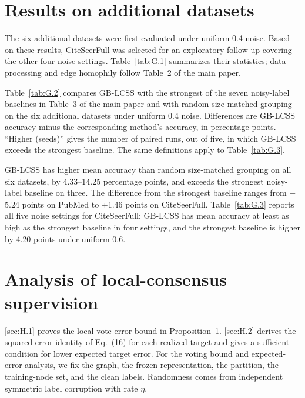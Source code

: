 \documentclass[10pt,letterpaper,nopreprintline]{elsarticle}
\begin{document}
\setcounter{table}{0}

\section{Results on additional datasets}\label{sec:G}

The six additional datasets were first evaluated under uniform 0.4 noise. Based on these results, CiteSeerFull was selected for an exploratory follow-up covering the other four noise settings. Table~\ref{tab:G.1} summarizes their statistics; data processing and edge homophily follow Table~2 of the main paper.



Table~\ref{tab:G.2} compares GB-LCSS with the strongest of the seven noisy-label baselines in Table~3 of the main paper and with random size-matched grouping on the six additional datasets under uniform 0.4 noise. Differences are GB-LCSS accuracy minus the corresponding method's accuracy, in percentage points. ``Higher (seeds)'' gives the number of paired runs, out of five, in which GB-LCSS exceeds the strongest baseline. The same definitions apply to Table~\ref{tab:G.3}.



GB-LCSS has higher mean accuracy than random size-matched grouping on all six datasets, by 4.33--14.25 percentage points, and exceeds the strongest noisy-label baseline on three. The difference from the strongest baseline ranges from \ensuremath{-}5.24 points on PubMed to +1.46 points on CiteSeerFull. Table~\ref{tab:G.3} reports all five noise settings for CiteSeerFull; GB-LCSS has mean accuracy at least as high as the strongest baseline in four settings, and the strongest baseline is higher by 4.20 points under uniform 0.6.




\FloatBarrier
\setcounter{table}{0}
\section{Analysis of local-consensus supervision}\label{sec:H}
\setcounter{equation}{0}
\renewcommand{\theequation}{H.\arabic{equation}}
\renewcommand{\theHequation}{H.\arabic{equation}}

\ref*{sec:H.1} proves the local-vote error bound in Proposition~1. \ref*{sec:H.2} derives the squared-error identity of Eq.~(16) for each realized target and gives a sufficient condition for lower expected target error. For the voting bound and expected-error analysis, we fix the graph, the frozen representation, the partition, the training-node set, and the clean labels. Randomness comes from independent symmetric label corruption with rate \(\eta\).
\end{document}
